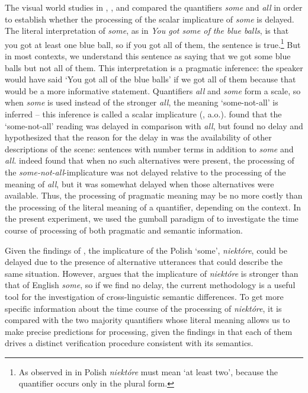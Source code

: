 \documentclass[output=paper]{langscibook}
\begin{document}
The visual world studies in \citet{huang2009online, huang2011logic}, \citet{grodner2010some}, and \citet{degen2011making, degen2016availability}
compared the quantifiers \textit{some} and \textit{all} in order to establish whether the processing of the scalar
implicature of \textit{some} is delayed. The literal interpretation of \textit{some}, as in \textit{You got some of the blue
balls}, is that you got at least one
blue ball, so if you got all of them, the sentence is true.\footnote{As observed in \citet{spychalska-msc} in Polish \textit{niektóre} must mean `at least two', because the quantifier occurs only in the plural form.} But in most contexts, we understand this sentence as saying
that we got some blue balls but not all of them. This interpretation is a pragmatic inference: the speaker would have
said ‘You got all of the blue balls’ if we got all of them because that would be a more informative statement.
Quantifiers \textit{all} and \textit{some} form a scale, so when \textit{some} is used instead of the stronger
\textit{all}, the meaning `some-not-all' is inferred -- this inference is called a scalar implicature (\citealt{horn1972, Levinson1983}, a.o.). \citet{huang2009online} found that the `some-not-all' reading was delayed in
comparison with \textit{all}, but \citet{grodner2010some} found no delay and \citet{degen2011making, degen2016availability} hypothesized
that the reason for the delay in \citet{huang2009online} was the availability of other descriptions of the scene:
sentences with number terms in addition to \textit{some }and \textit{all}. \citet{degen2016availability} indeed found that
when no such alternatives were present, the processing of the \textit{some-not-all}-implicature was not delayed
relative to the processing of the meaning of \textit{all}, but it was somewhat delayed when those alternatives were
available. Thus, the processing of pragmatic meaning may be no more costly than the processing of the literal meaning
of a quantifier, depending on the context. In the present experiment, we used the gumball paradigm of \citet{degen2011making, degen2016availability} to investigate the time course of processing of both pragmatic and semantic information. 

Given the findings of \citet{degen2011making, degen2016availability}, the implicature of the Polish `some', \textit{niektóre}, could be
delayed due to the presence of alternative utterances that could describe the same situation. However, \citet{spychalska-msc} argues that the implicature of \textit{niektóre} is stronger than that of English \textit{some}, so if we
find no delay, the current methodology is a useful tool for the investigation of cross-linguistic semantic differences.
To get more specific information about the time course of the processing of \textit{niektóre}, it is compared with the
two majority quantifiers whose literal meaning allows us to make precise predictions for processing, given the findings
in \citet{tomaszewicz2011verification, tomaszewicz2012semantics, tomaszewicz2013linguistic, tomaszewicz2018focus} that each of them drives a distinct verification procedure consistent with its semantics.
\end{document}
